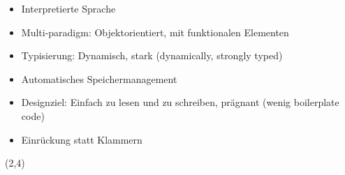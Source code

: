 \documentclass[aspectratio=169,t]{beamer}
\begin{document}
\begin{frame}[fragile]{}
    \begin{itemize}
        \item Interpretierte Sprache
        \item<4-> Multi-paradigm: Objektorientiert, mit funktionalen Elementen
        \item<4-> Typisierung: Dynamisch, stark (dynamically, strongly typed)
        \item<6-> Automatisches Speichermanagement
        \item<7-> Designziel: Einfach zu lesen und zu schreiben, prägnant (wenig boilerplate code)
        \item<7-> Einrückung statt Klammern
    \end{itemize}
     {
        \begin{textblock}{10}(2,4)
            \begin{figure}
                

\end{figure}
\end{textblock}}
\end{frame}
\end{document}
